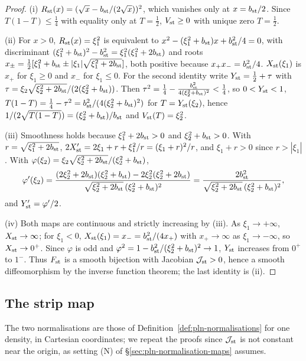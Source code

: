 \begin{proof}
(i) $R_{\rm st}(x)=(\sqrt x-b_{\rm st}/(2\sqrt x))^2$, which vanishes only at $x=b_{\rm st}/2$. Since $T(1-T)\le\frac14$ with
equality only at $T=\frac12$, $V_{\rm st}\ge0$ with unique zero $T=\frac12$.

(ii) For $x>0$, $R_{\rm st}(x)=\xi_1^2$ is equivalent to $x^2-(\xi_1^2+b_{\rm st})x+b_{\rm st}^2/4=0$, with discriminant
$(\xi_1^2+b_{\rm st})^2-b_{\rm st}^2=\xi_1^2(\xi_1^2+2b_{\rm st})$ and roots
$x_\pm=\frac12[\xi_1^2+b_{\rm st}\pm|\xi_1|\sqrt{\xi_1^2+2b_{\rm st}}]$, both positive because $x_+x_-=b_{\rm st}^2/4$.
$X_{\rm st}(\xi_1)$ is $x_+$ for $\xi_1\ge0$ and $x_-$ for $\xi_1\le0$. For the second identity write $Y_{\rm st}=\frac12+\tau$
with $\tau=\xi_2\sqrt{\xi_2^2+2b_{\rm st}}/(2(\xi_2^2+b_{\rm st}))$. Then
$\tau^2=\frac14-\frac{b_{\rm st}^2}{4(\xi_2^2+b_{\rm st})^2}<\frac14$, so $0<Y_{\rm st}<1$,
$T(1-T)=\frac14-\tau^2=b_{\rm st}^2/(4(\xi_2^2+b_{\rm st})^2)$ for $T=Y_{\rm st}(\xi_2)$, hence
$1/(2\sqrt{T(1-T)})=(\xi_2^2+b_{\rm st})/b_{\rm st}$ and $V_{\rm st}(T)=\xi_2^2$.

(iii) Smoothness holds because $\xi_1^2+2b_{\rm st}>0$ and $\xi_2^2+b_{\rm st}>0$. With $r=\sqrt{\xi_1^2+2b_{\rm st}}$,
$2X_{\rm st}'=2\xi_1+r+\xi_1^2/r=(\xi_1+r)^2/r$, and $\xi_1+r>0$ since $r>|\xi_1|$. With
$\varphi(\xi_2)=\xi_2\sqrt{\xi_2^2+2b_{\rm st}}/(\xi_2^2+b_{\rm st})$,
\[
 \varphi'(\xi_2)=\frac{(2\xi_2^2+2b_{\rm st})(\xi_2^2+b_{\rm st})-2\xi_2^2(\xi_2^2+2b_{\rm st})}
 {\sqrt{\xi_2^2+2b_{\rm st}}\,(\xi_2^2+b_{\rm st})^2}
 =\frac{2b_{\rm st}^2}{\sqrt{\xi_2^2+2b_{\rm st}}\,(\xi_2^2+b_{\rm st})^2},
\]
and $Y_{\rm st}'=\varphi'/2$.

(iv) Both maps are continuous and strictly increasing by (iii). As $\xi_1\to+\infty$, $X_{\rm st}\to\infty$; for $\xi_1<0$,
$X_{\rm st}(\xi_1)=x_-=b_{\rm st}^2/(4x_+)$ with $x_+\to\infty$ as $\xi_1\to-\infty$, so $X_{\rm st}\to0^+$. Since $\varphi$ is odd
and $\varphi^2=1-b_{\rm st}^2/(\xi_2^2+b_{\rm st})^2\to1$, $Y_{\rm st}$ increases from $0^+$ to $1^-$. Thus $F_{\rm st}$ is a
smooth bijection with Jacobian $\mathcal J_{\rm st}>0$, hence a smooth diffeomorphism by the inverse function theorem;
the last identity is (ii).
\end{proof}

\subsection{The strip map}\label{sec:str-map}

The two normalisations are those of Definition~\ref{def:pln-normalisations} for one density, in Cartesian coordinates; we repeat the proofs since $\mathcal J_{\rm st}$ is not constant near the origin, as setting (N) of \S\ref{sec:pln-normalisation-maps} assumes.

